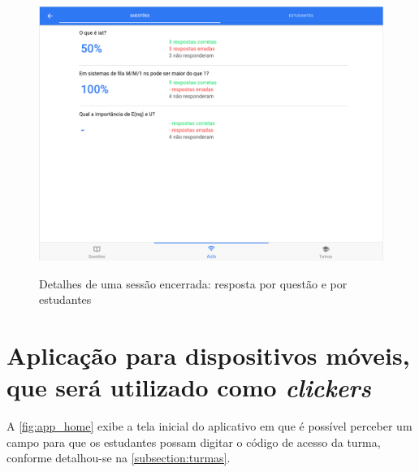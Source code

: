 \begin{figure}[ht]
  \centering
  \caption{Detalhes de uma sessão encerrada: resposta por questão e por estudantes}
  \includegraphics[scale=.35]{imagens/telas/session_students_details}
  \doautor
  \label{fig:session_students_details}
\end{figure}

\clearpage

\section{Aplicação para dispositivos móveis, que será utilizado como \textit{clickers}}

A \autoref{fig:app_home} exibe a tela inicial do aplicativo em que é possível perceber
um campo para que os estudantes possam digitar o código de acesso da turma, conforme detalhou-se
na \autoref{subsection:turmas}.

